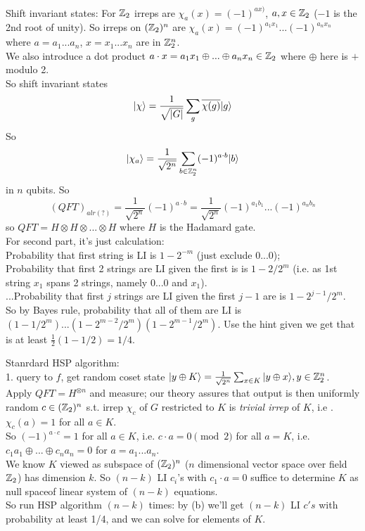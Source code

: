 \documentclass[a4paper]{article}
\begin{document}
Shift invariant states: For $\mathbb{Z}_2$ irreps are $\chi_a(x) = (-1)^{ax)}$, $a,x \in \mathbb{Z}_2$ ($-1$ is the 2nd root of unity). So irreps on $(\mathbb{Z}_2)^n$ are $\chi_a(x) =(-1)^{a_1x_1} ... (-1)^{a_nx_n}$ where $a=a_1...a_n$, $x=x_1...x_n$ are in $\mathbb{Z}_2^n$.\\
We also introduce a dot product $a \cdot x = a_1x_1 \oplus ... \oplus a_n x_n \in \mathbb{Z}_2$ where $\oplus$ here is $+$ modulo 2.\\
So shift invariant states
$$|\chi\rangle = \frac{1}{\sqrt{|G|}} \sum_g \overline{\chi(g)} |g\rangle$$
So
$$|\chi_a\rangle = \frac{1}{\sqrt{2^n}} \sum_{b \in \mathbb{Z}_2^n} (-1)^{a\cdot b} |b\rangle$$
in $n$ qubits. So
$$(QFT)_{alr(?)} = \frac{1}{\sqrt{2^n}} (-1)^{a \cdot b} = \frac{1}{\sqrt{2^n}} (-1)^{a_1b_1}...(-1)^{a_nb_n}$$
so $QFT = H \otimes H \otimes ... \otimes H$ where $H$ is the Hadamard gate.\\
For second part, it's just calculation:\\
Probability that first string is LI is $1-2^{-m}$ (just exclude $0...0$);\\
Probability that first 2 strings are LI given the first is is $1-2/2^m$ (i.e. as 1st string $x_1$ spans 2 strings, namely $0...0$ and $x_1$).\\
...Probability that first $j$ strings are LI given the first $j-1$ are is $1-2^{j-1}/2^m$.\\
So by Bayes rule, probability that all of them are LI is $(1-1/2^m)...(1-2^{m-2}/2^m)(1-2^{m-1}/2^m)$. Use the hint given we get that is at least $\frac{1}{2}(1-1/2) =1/4$.

Stanrdard HSP algorithm:\\
1. query to $f$, get random coset state $|y \oplus K \rangle = \frac{1}{\sqrt{2^n}} \sum_{x \in K} | y \oplus x\rangle, y \in \mathbb{Z}_2^n$.\\
Apply $QFT=H^{\otimes n}$ and measure; our theory assures that output is then uniformly random $c\in(\mathbb{Z}_2)^n$ s.t. irrep $\chi_c$ of $G$ restricted to $K$ is \emph{trivial irrep} of $K$, i.e .$\chi_c(a) = 1$ for all $a \in K$.\\
So $(-1)^{a \cdot c} = 1$ for all $a \in K$, i.e. $c \cdot a = 0 \pmod 2$ for all $a=K$, i.e. $c_1a_1\oplus ... \oplus c_na_n=0$ for $a=a_1...a_n$.\\
We know $K$ viewed as subspace of $(\mathbb{Z}_2)^n$ ($n$ dimensional vector space over field $\mathbb{Z}_2$) has dimension $k$. So $(n-k)$ LI $c_i$'s with $c_1 \cdot a=0$ suffice to determine $K$ as null spaceof linear system of $(n-k)$ equations.\\
So run HSP algorithm $(n-k)$ times: by (b) we'll get $(n-k)$ LI $c's$ with probability at least 1/4, and we can solve for elements of $K$.
\end{document}
